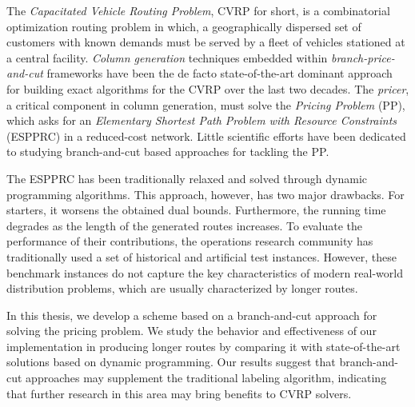 {
\setlength\parindent{0pt}

The \textit{Capacitated Vehicle Routing Problem}, CVRP for short, is a combinatorial optimization routing problem in which, a geographically dispersed set of customers with known demands must be served by a fleet of vehicles stationed at a central facility.
\textit{Column generation} techniques embedded within \textit{branch-price-and-cut} frameworks have been the de facto state-of-the-art dominant approach for building exact algorithms for the CVRP over the last two decades.
The \textit{pricer}, a critical component in column generation, must solve the \textit{Pricing Problem} (PP), which asks for an \textit{Elementary Shortest Path Problem with Resource Constraints} (ESPPRC) in a reduced-cost network.
Little scientific efforts have been dedicated to studying branch-and-cut based approaches for tackling the PP.

The ESPPRC has been traditionally relaxed and solved through dynamic programming algorithms.
This approach, however, has two major drawbacks.
For starters, it worsens the obtained dual bounds.
Furthermore, the running time degrades as the length of the generated routes increases.
To evaluate the performance of their contributions, the operations research community has traditionally used a set of historical and artificial test instances.
However, these benchmark instances do not capture the key characteristics of modern real-world distribution problems, which are usually characterized by longer routes.

In this thesis, we develop a scheme based on a branch-and-cut approach for solving the pricing problem.
We study the behavior and effectiveness of our implementation in producing longer routes by comparing it with state-of-the-art solutions based on dynamic programming.
Our results suggest that branch-and-cut approaches may supplement the traditional labeling algorithm, indicating that further research in this area may bring benefits to CVRP solvers.
}
